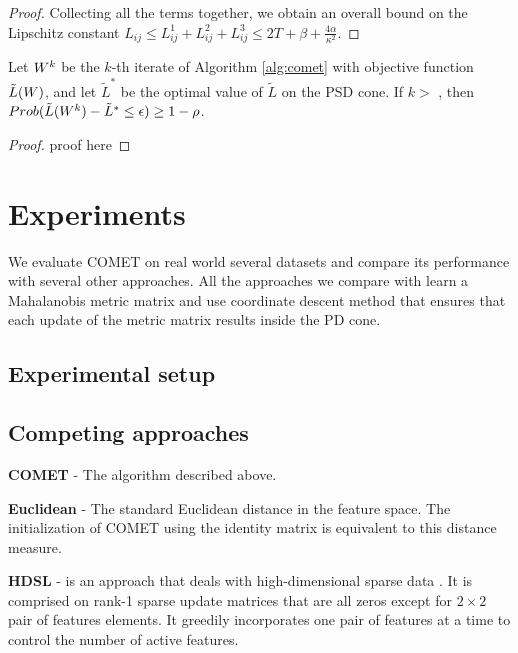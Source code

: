 \documentclass{article}
\begin{document}
\begin{proof}
Collecting all the terms together, we obtain an overall bound on the Lipschitz constant $L_{ij} \leq L^1_{ij} + L^2_{ij} + L^3_{ij} \leq 2 T + \beta + \frac{4 \alpha}{\kappa ^2}.$



\end{proof}

\begin{theorem}
Let ${W}^k$ be the $k$-th iterate of Algorithm \ref{alg:comet} with objective function $\tilde{L}({W})$, and let $\tilde{L}^*$ be the optimal value of $\tilde{L}$ on the PSD cone.
If $k >$ , then $Prob(\tilde{L}({W}^k) - \tilde{L}^* \leq \epsilon) \geq 1-\rho$.
\end{theorem}
\begin{proof}
proof here
\end{proof}
\section{Experiments}
We evaluate COMET on real world several datasets and compare its performance with several other approaches. All the approaches we compare with learn a Mahalanobis metric matrix and use coordinate descent method that ensures that each update of the metric matrix results inside the PD cone. 


\subsection{Experimental setup}

\subsection{Competing approaches}



\textbf{COMET} - The algorithm described above.

\textbf{Euclidean} - The standard Euclidean distance in the feature space. The initialization of COMET using the identity matrix is equivalent to this distance measure.

\textbf{HDSL} - is an approach that deals with high-dimensional sparse data \cite{hdsl}. It is comprised on rank-1 sparse update matrices that are all zeros except for $2\times2$ pair of features elements. It greedily incorporates one pair of features at a time to control the number of active features.
\end{document}
